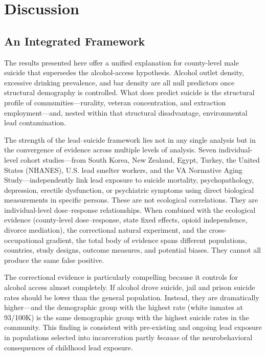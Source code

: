 \documentclass[11pt,twocolumn]{article}
\begin{document}
\section{Discussion}

\subsection{An Integrated Framework}

The results presented here offer a unified explanation for county-level male suicide that supersedes the alcohol-access hypothesis. Alcohol outlet density, excessive drinking prevalence, and bar density are all null predictors once structural demography is controlled. What does predict suicide is the structural profile of communities---rurality, veteran concentration, and extraction employment---and, nested within that structural disadvantage, environmental lead contamination.

The strength of the lead--suicide framework lies not in any single analysis but in the convergence of evidence across multiple levels of analysis. Seven individual-level cohort studies---from South Korea, New Zealand, Egypt, Turkey, the United States (NHANES), U.S. lead smelter workers, and the VA Normative Aging Study---independently link lead exposure to suicide mortality, psychopathology, depression, erectile dysfunction, or psychiatric symptoms using direct biological measurements in specific persons. These are not ecological correlations. They are individual-level dose--response relationships. When combined with the ecological evidence (county-level dose--response, state fixed effects, opioid independence, divorce mediation), the correctional natural experiment, and the cross-occupational gradient, the total body of evidence spans different populations, countries, study designs, outcome measures, and potential biases. They cannot all produce the same false positive.

The correctional evidence is particularly compelling because it controls for alcohol access almost completely. If alcohol drove suicide, jail and prison suicide rates should be lower than the general population. Instead, they are dramatically higher---and the demographic group with the highest rate (white inmates at 93/100K) is the same demographic group with the highest suicide rates in the community. This finding is consistent with pre-existing and ongoing lead exposure in populations selected into incarceration partly \textit{because} of the neurobehavioral consequences of childhood lead exposure.
\end{document}
